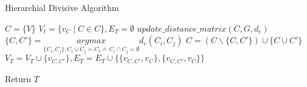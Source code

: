 \documentclass[a4paper]{article}
\begin{document}
  \begin{algorithm}
   \caption{Hierarchial Divisive Algorithm ~\cite{hda1}}
    \begin{algorithmic}[1]
     \State $C = \{ V\} $ 
     \State $V_t = \{v_C\mid C \in C\},E_T = \emptyset$ 
     \State $update\_distance\_matrix(C,G,d_c)$
     \State $\{C,C'\} =  \underset{\{C_i,C_j\}  : C_i \cup C_j = C_x   \wedge \  C_i \cap C_j = \emptyset}{argmax} d_c (C_i,C_j)$
     \State $C = (C \backslash \{C,C'\}) \cup \{C \cup C'\}$ 
     \State $V_T = V_T \cup \{v_{C,C'}\},E_T = E_T \cup \{\{v_{C,C'} ,v_{C}\},\{v_{C,C'} ,v_{C}\}\}$ 
     \EndWhile
    
      
        
       
       \State Return $T$



 

\end{algorithmic}
\end{algorithm}
\end{document}
